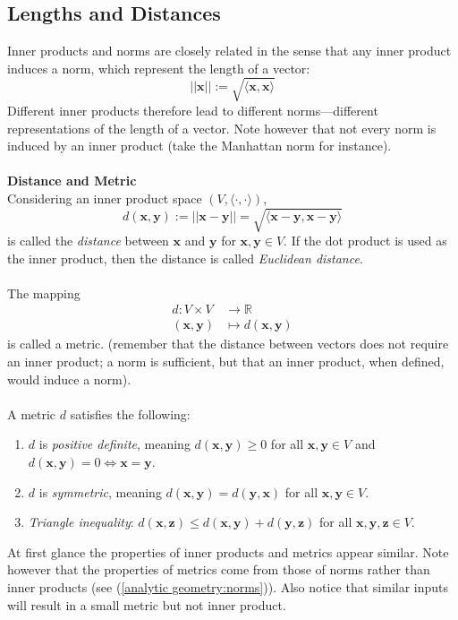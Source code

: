 \documentclass{report}
\begin{document}
\subsection{Lengths and Distances} %
Inner products and norms are closely related in the sense that any inner product induces a norm, which represent
the length of a vector:
\begin{equation*}
||\bm{x}||:=\sqrt{\langle\bm{x},\bm{x}\rangle}
\end{equation*}
Different inner products therefore lead to different norms---different representations of the length
of a vector. Note however that not every norm is induced by an inner product 
(take the Manhattan norm for instance).\\
\vspace{1mm}\\
\textbf{Distance and Metric}\\
Considering an inner product space $(V,\langle\cdot,\cdot\rangle)$, 
\begin{equation*}
d(\bm{x},\bm{y}):=||\bm{x}-\bm{y}||=\sqrt{\langle\bm{x}-\bm{y},\bm{x}-\bm{y}\rangle}
\end{equation*}
is called the \textit{distance} between $\bm{x}$ and $\bm{y}$ for $\bm{x},\bm{y}\in V$. If
the dot product is used as the inner product, then the distance is called \textit{Euclidean distance}.\\
\vspace{1mm}\\
The mapping 
\begin{align*}
d:V\times V&\to\mathbb{R}\\
(\bm{x},\bm{y})&\mapsto d(\bm{x},\bm{y})
\end{align*}
is called a metric. (remember that the distance between vectors does not require an inner product; 
a norm is sufficient, but that an inner product, when defined, would induce a norm).\\
\vspace{1mm}\\
A metric $d$ satisfies the following:
\begin{enumerate}
\item$d$ is \textit{positive definite}, meaning $d(\bm{x},\bm{y})\geq0$ for all $\bm{x},\bm{y}\in V$
and $d(\bm{x},\bm{y})=0\iff\bm{x}=\bm{y}$.
\item$d$ is \textit{symmetric}, meaning $d(\bm{x},\bm{y})=d(\bm{y},\bm{x})$ for all $\bm{x},\bm{y}\in V$.
\item\textit{Triangle inequality}: $d(\bm{x},\bm{z})\leq
d(\bm{x},\bm{y})+d(\bm{y},\bm{z})$ for
all $\bm{x},\bm{y},\bm{z}\in V$.
\end{enumerate}
At first glance the properties of inner products and metrics appear similar. Note however that the 
properties of metrics come from those of norms rather than inner products (see (\ref{analytic geometry:norms})). 
Also notice that similar inputs will result in a small metric but not inner product.
\newpage
\end{document}

